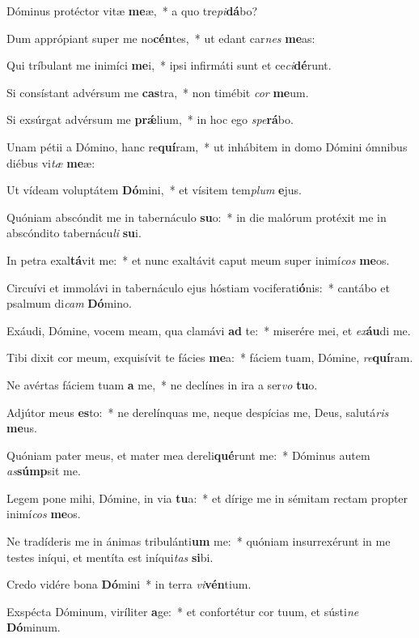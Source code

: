 \item Dóminus protéctor vitæ \textbf{me}æ,~* a quo tre\textit{pi}\textbf{dá}bo?
\item Dum apprópiant super me no\textbf{cén}tes,~* ut edant car\textit{nes} \textbf{me}as:
\item Qui tríbulant me inimíci \textbf{me}i,~* ipsi infirmáti sunt et ce\textit{ci}\textbf{dé}runt.
\item Si consístant advérsum me \textbf{cas}tra,~* non timébit \textit{cor} \textbf{me}um.
\item Si exsúrgat advérsum me \textbf{prǽ}lium,~* in hoc ego \textit{spe}\textbf{rá}bo.
\item Unam pétii a Dómino, hanc re\textbf{quí}ram,~* ut inhábitem in domo Dómini ómnibus diébus vi\textit{tæ} \textbf{me}æ:
\item Ut vídeam voluptátem \textbf{Dó}mini,~* et vísitem tem\textit{plum} \textbf{e}jus.
\item Quóniam abscóndit me in tabernáculo \textbf{su}o:~* in die malórum protéxit me in abscóndito tabernácu\textit{li} \textbf{su}i.
\item In petra exal\textbf{tá}vit me:~* et nunc exaltávit caput meum super inimí\textit{cos} \textbf{me}os.
\item Circuívi et immolávi in tabernáculo ejus hóstiam vociferati\textbf{ó}nis:~* cantábo et psalmum di\textit{cam} \textbf{Dó}mino.
\item Exáudi, Dómine, vocem meam, qua clamávi \textbf{ad} te:~* miserére mei, et \textit{ex}\textbf{áu}di me.
\item Tibi dixit cor meum, exquisívit te fácies \textbf{me}a:~* fáciem tuam, Dómine, \textit{re}\textbf{quí}ram.
\item Ne avértas fáciem tuam \textbf{a} me,~* ne declínes in ira a ser\textit{vo} \textbf{tu}o.
\item Adjútor meus \textbf{es}to:~* ne derelínquas me, neque despícias me, Deus, salutá\textit{ris} \textbf{me}us.
\item Quóniam pater meus, et mater mea dereli\textbf{qué}runt me:~* Dóminus autem \textit{as}\textbf{súmp}sit me.
\item Legem pone mihi, Dómine, in via \textbf{tu}a:~* et dírige me in sémitam rectam propter inimí\textit{cos} \textbf{me}os.
\item Ne tradíderis me in ánimas tribulánti\textbf{um} me:~* quóniam insurrexérunt in me testes iníqui, et mentíta est iníqui\textit{tas} \textbf{si}bi.
\item Credo vidére bona \textbf{Dó}mini~* in terra \textit{vi}\textbf{vén}tium.
\item Exspécta Dóminum, viríliter \textbf{a}ge:~* et confortétur cor tuum, et sústi\textit{ne} \textbf{Dó}minum.

